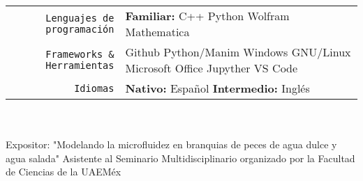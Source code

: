 \documentclass[
    10pt,
    A4,
    spanish,
    draft = false,
    twoside = false,
]{article}
\begin{document}
	\tab \begin{tabular}{r p{}}
		\texttt{\large Lenguajes de programación} & \textbf{Familiar:} C++ \cvContactSep Python \cvContactSep Wolfram Mathematica\\
		\texttt{\large Frameworks \& Herramientas} & Github \cvContactSep Python/Manim \cvContactSep Windows \cvContactSep GNU/Linux \cvContactSep Microsoft Office \cvContactSep Jupyther \cvContactSep VS Code\\
		\texttt{\large Idiomas} & \textbf{Nativo:} Español \cvContactSep \textbf{Intermedio:} Inglés \\
	\end{tabular}\\~\\
	{Expositor: "Modelando la microfluidez en branquias de peces de agua dulce y agua salada"}
	{Asistente al Seminario Multidisciplinario organizado por la Facultad de Ciencias de la UAEMéx}
\end{document}
